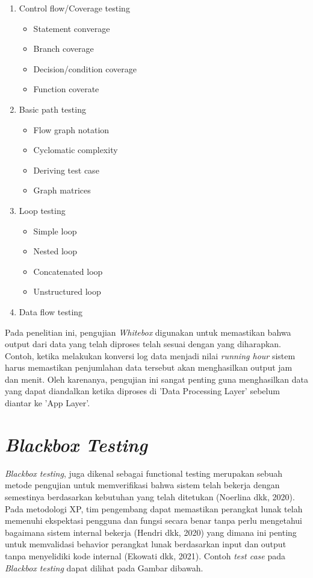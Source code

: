 \begin{enumerate}
    \item Control flow/Coverage testing
    \begin{itemize}
        \item Statement converage
        \item Branch coverage
        \item Decision/condition coverage
        \item Function coverate
    \end{itemize}

    \item Basic path testing
    \begin{itemize}
        \item Flow graph notation
        \item Cyclomatic complexity
        \item Deriving test case
        \item Graph matrices
    \end{itemize}

    \item Loop testing
    \begin{itemize}
        \item Simple loop
        \item Nested loop
        \item Concatenated loop
        \item Unstructured loop
    \end{itemize}

    \item Data flow testing
\end{enumerate}

Pada penelitian ini, pengujian \textit{Whitebox} digunakan untuk memastikan bahwa output dari data yang telah diproses telah sesuai dengan yang diharapkan. Contoh, ketika melakukan konversi log data menjadi nilai \textit{running hour} sistem harus memastikan penjumlahan data tersebut akan menghasilkan output jam dan menit. Oleh karenanya, pengujian ini sangat penting guna menghasilkan data yang dapat diandalkan ketika diproses di 'Data Processing Layer' sebelum diantar ke 'App Layer'.

\section{\textit{Blackbox Testing}}
\textit{Blackbox testing}, juga dikenal sebagai functional testing merupakan sebuah metode pengujian untuk memverifikasi bahwa sistem telah bekerja dengan semestinya berdasarkan kebutuhan yang telah ditetukan (Noerlina dkk, 2020). Pada metodologi XP, tim pengembang dapat memastikan perangkat lunak telah memenuhi ekspektasi pengguna dan fungsi secara benar tanpa perlu mengetahui bagaimana sistem internal bekerja (Hendri dkk, 2020) yang dimana ini penting untuk memvalidasi behavior perangkat lunak berdasarkan input dan output tanpa menyelidiki kode internal (Ekowati dkk, 2021). Contoh \textit{test case} pada \textit{Blackbox testing} dapat dilihat pada Gambar dibawah.

